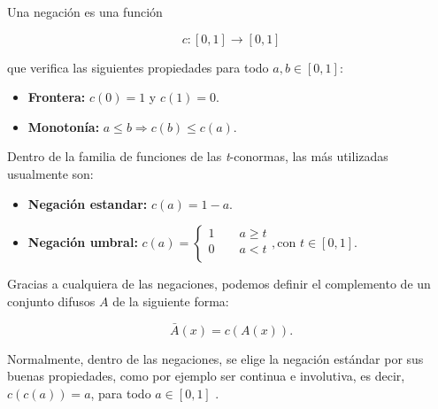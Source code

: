 Una negación es una función

\[
\ c: [0,1] \longrightarrow [0,1]
\]

que verifica las siguientes propiedades para todo $a,b \in [0,1]$:
\begin{itemize}
\item \textbf{Frontera:} $c(0) = 1$ y $c(1) = 0$.
\item \textbf{Monotonía:} $a \leq b \Rightarrow c(b) \leq c(a)$.
\end{itemize}

Dentro de la familia de funciones de las \textit{t}-conormas, las más utilizadas usualmente son:

\begin{itemize}
\item \textbf{Negación estandar:} $c(a)= 1-a$.
\item \textbf{Negación umbral:} $c(a)= \left\lbrace
  \begin{array}{l}
     1 \qquad a \geq t \\
     0 \qquad a < t \\
  \end{array}
  \right. , \textrm{con } t\in [0,1]$.
\end{itemize}

Gracias a cualquiera de las negaciones, podemos definir el complemento de un conjunto difusos $A$ de la siguiente forma:

\[
\ \bar{A}(x)= c(A(x)).
\]

Normalmente, dentro de las negaciones, se elige la negación estándar por sus buenas propiedades, como por ejemplo ser continua e involutiva, es decir, $c\left(c\left(a\right)\right)=a$, para todo $a \in [0,1]$ .


